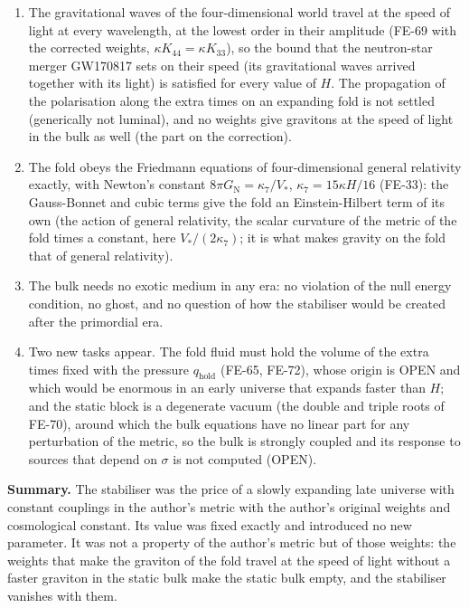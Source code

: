 \documentclass[
  10pt,
]{article}
\providecommand{\tightlist}{%
  \setlength{\itemsep}{0pt}\setlength{\parskip}{0pt}}
\begin{document}
\begin{enumerate}
\def\labelenumi{\arabic{enumi}.}
\tightlist
\item
  The gravitational waves of the four-dimensional world travel at the
  speed of light at every wavelength, at the lowest order in their
  amplitude (FE-69 with the corrected weights,
  \(\kappa K_{44} = \kappa K_{33}\)), so the bound that the neutron-star
  merger GW170817 sets on their speed (its gravitational waves arrived
  together with its light) is satisfied for every value of \(H\). The
  propagation of the polarisation along the extra times on an expanding
  fold is not settled (generically not luminal), and no weights give
  gravitons at the speed of light in the bulk as well (the part on the
  correction).
\item
  The fold obeys the Friedmann equations of four-dimensional general
  relativity exactly, with Newton's constant
  \(8\pi G_{\mathrm{N}} = \kappa_7/V_*\), \(\kappa_7 = 15\kappa H/16\)
  (FE-33): the Gauss-Bonnet and cubic terms give the fold an
  Einstein-Hilbert term of its own (the action of general relativity,
  the scalar curvature of the metric of the fold times a constant, here
  \(V_*/(2\kappa_7)\); it is what makes gravity on the fold that of
  general relativity).
\item
  The bulk needs no exotic medium in any era: no violation of the null
  energy condition, no ghost, and no question of how the stabiliser
  would be created after the primordial era.
\item
  Two new tasks appear. The fold fluid must hold the volume of the extra
  times fixed with the pressure \(q_{\mathrm{hold}}\) (FE-65, FE-72),
  whose origin is OPEN and which would be enormous in an early universe
  that expands faster than \(H\); and the static block is a degenerate
  vacuum (the double and triple roots of FE-70), around which the bulk
  equations have no linear part for any perturbation of the metric, so
  the bulk is strongly coupled and its response to sources that depend
  on \(\sigma\) is not computed (OPEN).
\end{enumerate}

\textbf{Summary.} The stabiliser was the price of a slowly expanding
late universe with constant couplings in the author's metric with the
author's original weights and cosmological constant. Its value was fixed
exactly and introduced no new parameter. It was not a property of the
author's metric but of those weights: the weights that make the graviton
of the fold travel at the speed of light without a faster graviton in
the static bulk make the static bulk empty, and the stabiliser vanishes
with them.
\end{document}
